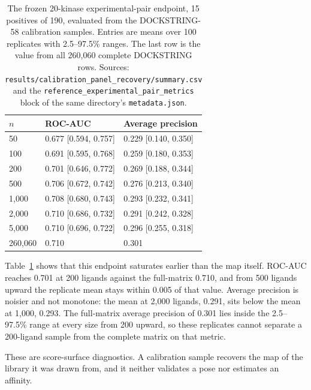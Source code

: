 \begin{table}[htbp]
\centering
\caption{The frozen 20-kinase experimental-pair endpoint, 15 positives of 190, evaluated from the
DOCKSTRING-58 calibration samples. Entries are means over 100 replicates with 2.5--97.5\% ranges.
The last row is the value from all 260{,}060 complete DOCKSTRING rows. Sources:
\texttt{results/calibration\_panel\_recovery/summary.csv} and the
\texttt{reference\_experimental\_pair\_metrics} block of the same directory's
\texttt{metadata.json}.}
\label{tab:s5endpoint}
\small
\begin{tabular}{lll}
\toprule
$n$ & ROC-AUC & Average precision \\
\midrule
50 & 0.677 [0.594, 0.757] & 0.229 [0.140, 0.350] \\
100 & 0.691 [0.595, 0.768] & 0.259 [0.180, 0.353] \\
200 & 0.701 [0.646, 0.772] & 0.269 [0.188, 0.344] \\
500 & 0.706 [0.672, 0.742] & 0.276 [0.213, 0.340] \\
1{,}000 & 0.708 [0.680, 0.743] & 0.293 [0.232, 0.341] \\
2{,}000 & 0.710 [0.686, 0.732] & 0.291 [0.242, 0.328] \\
5{,}000 & 0.710 [0.696, 0.722] & 0.296 [0.255, 0.318] \\
\midrule
260{,}060 & 0.710 & 0.301 \\
\bottomrule
\end{tabular}
\end{table}

Table~\ref{tab:s5endpoint} shows that this endpoint saturates earlier than the map itself.
ROC-AUC reaches 0.701 at 200 ligands against the full-matrix 0.710, and from 500 ligands upward
the replicate mean stays within 0.005 of that value. Average precision is noisier and not
monotone: the mean at 2{,}000 ligands, 0.291, sits below the mean at 1{,}000, 0.293. The
full-matrix average precision of 0.301 lies inside the 2.5--97.5\% range at every size from 200
upward, so these replicates cannot separate a 200-ligand sample from the complete matrix on that
metric.

These are score-surface diagnostics. A calibration sample recovers the map of the library it was
drawn from, and it neither validates a pose nor estimates an affinity.


